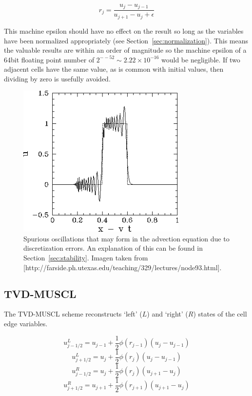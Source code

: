 \documentclass[12pt,upcase]{umlthesis}
\begin{document}
\begin{equation}
	r_j = \frac{u_j - u_{j-1}}{u_{j+1} - u_j + \epsilon}
\end{equation}

This machine epsilon should have no effect on the result so long as the variables have been normalized appropriately (see Section~\ref{sec:normalization}). This means the valuable results are within an order of magnitude so the machine epsilon of a 64bit floating point number of $2^{-−52} \sim 2.22 \times 10^{-16}$ would be negligible. If two adjacent cells have the same value, as is common with initial values, then dividing by zero is usefully avoided.

\begin{figure}[ht!]
	\centering
	\includegraphics[width=0.75\textwidth]{images/spuriousoscillations.png} 
	\caption{Spurious oscillations that may form in the advection equation due to discretization errors. An explanation of this can be found in Section~\ref{sec:stability}. Imagen taken from [http://farside.ph.utexas.edu/teaching/329/lectures/node93.html].}\label{fig:spuriousoscillations}
\end{figure}


\subsection{TVD-MUSCL}\label{sec:tvd-muscl}

The TVD-MUSCL scheme reconstructs `left' ($L$) and `right' ($R$) states of the cell edge variables. 

\begin{equation}
	u^L_{j-1/2} = u_{j-1} + \frac{1}{2} \phi(r_{j-1}) (u_j - u_{j-1})
\end{equation}
\begin{equation}
	u^L_{j+1/2} = u_{j} + \frac{1}{2} \phi(r_{j}) (u_j - u_{j-1})
\end{equation}
\begin{equation}
	u^R_{j-1/2} = u_{j} + \frac{1}{2} \phi(r_{j}) (u_{j+1} - u_{j})
\end{equation}
\begin{equation}
	u^R_{j+1/2} = u_{j+1} + \frac{1}{2} \phi(r_{j+1}) (u_{j+1} - u_{j})
\end{equation}
\end{document}

